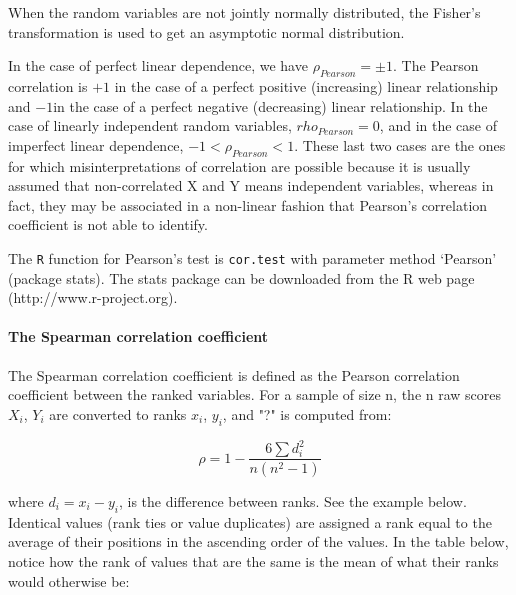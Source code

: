 \documentclass[a4paper]{article}
\begin{document}
When the random variables are not jointly normally distributed, the Fisher's transformation is used to get an asymptotic normal distribution.

In the case of perfect linear dependence, we have $\rho_{Pearson} = \pm1$. The Pearson correlation is $+1$ in the case of a perfect positive (increasing) linear relationship and $-1 $in the case of a perfect negative (decreasing) linear relationship. In the case of linearly independent random variables, $rho_{Pearson} = 0$, and in the case of imperfect linear dependence, $-1 < \rho_{Pearson} < 1$. These last two cases are the ones for which misinterpretations of correlation are possible because it is usually assumed that non-correlated X and Y means independent variables, whereas in fact, they may be associated in a non-linear fashion that Pearson's correlation coefficient is not able to identify.

The \texttt{R} function for Pearson's test is \texttt{cor.test} with parameter method `Pearson' (package stats). The stats package can be downloaded from the R web page (http://www.r-project.org).

\paragraph{The Spearman correlation coefficient}

The Spearman correlation coefficient is defined as the Pearson correlation coefficient between the ranked variables. For a sample of size n, the n raw scores $X_i$, $Y_i$ are converted to ranks $x_i$, $y_i$, and "?" is computed from: %

\begin{equation}
\rho = {1- \frac {6 \sum d_i^2}{n(n^2 - 1)}}
\end{equation}

where $d_{i} = x_{i} - y_{i}$, is the difference between ranks. See the example below. Identical values (rank ties or value duplicates) are assigned a rank equal to the average of their positions in the ascending order of the values. In the table below, notice how the rank of values that are the same is the mean of what their ranks would otherwise be:
\end{document}
